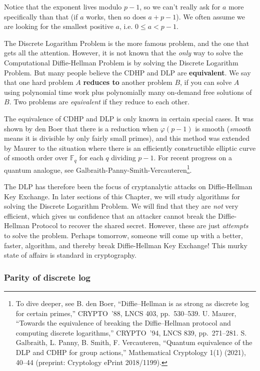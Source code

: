 \documentclass{article}
\theoremstyle{plain}
\theoremstyle{definition}
\theoremstyle{remark}
\numberwithin{theorem}{section}
\newcommand{\FF}{\mathbb{F}}
\begin{document}
Notice that the exponent lives modulo $p-1$, so we can't really ask for $a$ more specifically than that (if $a$ works, then so does $a + p-1$).  We often assume we are looking for the smallest positive $a$, i.e. $0 \le a < p-1$.

The Discrete Logarithm Problem is the more famous problem, and the one that gets all the attention.  However, it is not known that the \emph{only} way to solve the Computational Diffie-Hellman Problem is by solving the Discrete Logarithm Problem.  But many people believe the CDHP and DLP are \textbf{equivalent}.  We say that one hard problem $A$ \textbf{reduces to} another problem $B$, if you can solve $A$ using polynomial time work plus polynomially many on-demand free solutions of $B$.  Two problems are \emph{equivalent} if they reduce to each other.

The equivalence of CDHP and DLP is only known in certain special cases.  It was shown by den Boer that there is a reduction when $\varphi(p-1)$ is smooth (\emph{smooth} means it is divisible by only fairly small primes), and this method was extended by Maurer to the situation where there is an efficiently constructible elliptic curve of smooth order over $\FF_q$ for each $q$ dividing $p-1$.  For recent progress on a quantum analogue, see Galbraith-Panny-Smith-Vercauteren\footnote{To dive deeper, see B. den Boer, ``Diffie--Hellman is as strong as
discrete log for certain primes,'' CRYPTO~'88, LNCS 403, pp.~530--539.
U. Maurer, ``Towards the equivalence of breaking the Diffie--Hellman protocol
and computing discrete logarithms,'' CRYPTO~'94, LNCS 839, pp.~271--281.
S. Galbraith, L. Panny, B. Smith, F. Vercauteren, ``Quantum equivalence of the
DLP and CDHP for group actions,'' Mathematical Cryptology 1(1) (2021), 40--44
(preprint: Cryptology ePrint 2018/1199).}.

The DLP has therefore been the focus of cryptanalytic attacks on Diffie-Hellman Key Exchange.  In later sections of this Chapter, we will study algorithms for solving the Discrete Logarithm Problem.  We will find that they are \emph{not} very efficient, which gives us confidence that an attacker cannot break the Diffie-Hellman Protocol to recover the shared secret.  However, these are just \emph{attempts} to solve the problem.  Perhaps tomorrow, someone will come up with a better, faster, algorithm, and thereby break Diffie-Hellman Key Exchange!  This murky state of affairs is standard in cryptography.



\subsubsection{Parity of discrete log}
\end{document}
